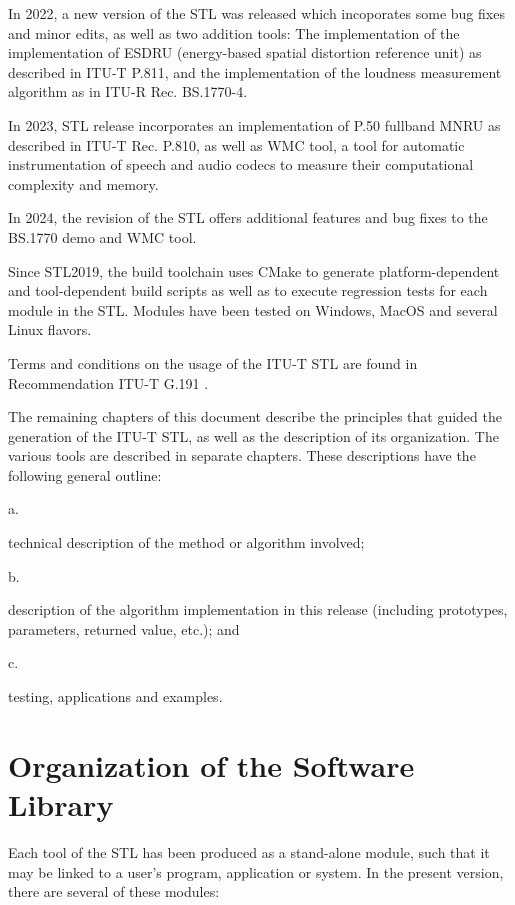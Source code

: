 In 2022, a new version of the STL was released which incoporates some bug fixes and minor edits, as well as two addition tools:
The implementation of the implementation of ESDRU (energy-based spatial distortion reference unit) as described in ITU-T P.811, and the implementation of the loudness measurement algorithm as in ITU-R Rec. BS.1770-4.

In 2023, STL release incorporates an implementation of P.50 fullband MNRU as described in ITU-T Rec. P.810, as well as WMC tool, a tool for automatic instrumentation of speech and audio codecs to measure their computational complexity and memory.

In 2024, the revision of the STL offers additional features and bug fixes to the BS.1770 demo and WMC tool.

Since STL2019, the build toolchain uses CMake to generate platform-dependent and tool-dependent build scripts as well as to execute regression tests for each module in the STL.
Modules have been tested on Windows, MacOS and several Linux flavors.

Terms and conditions on the usage of the ITU-T STL are found in Recommendation ITU-T G.191 \cite{G.191}.

The remaining chapters of this document describe the principles that guided the generation of the ITU-T STL, as well as the description of its organization.
The various tools are described in separate chapters.
These descriptions have the following general outline:

 a. \parbox[t]{140mm}{
               technical description of the method or algorithm involved;}

 b. \parbox[t]{140mm}{
               description of the algorithm implementation in this release (including prototypes, parameters, returned value, etc.); and }

 c. \parbox[t]{140mm}{
               testing, applications and examples.}




\section{Organization of the Software Library}

Each tool of the STL has been produced as a stand-alone module, such
that it may be linked to a user's program, application or system. In
the present version, there are several of these modules:

